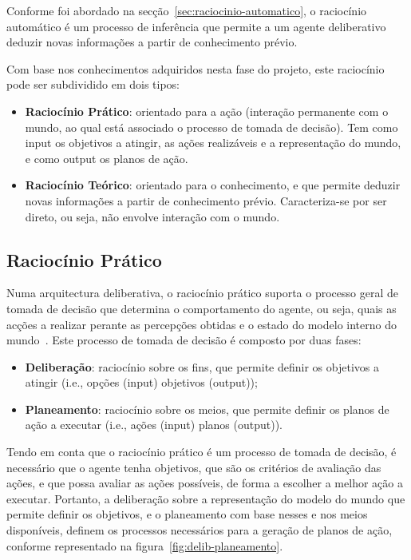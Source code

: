 Conforme foi abordado na secção~\ref{sec:raciocinio-automatico}, o raciocínio automático é um processo de inferência que permite a um agente deliberativo deduzir novas informações a partir de conhecimento prévio.

Com base nos conhecimentos adquiridos nesta fase do projeto, este raciocínio pode ser subdividido em dois tipos:

\begin{itemize}
    \item \textbf{Raciocínio Prático}: orientado para a ação (interação permanente com o mundo, ao qual está associado o processo de tomada de decisão).
    Tem como input os objetivos a atingir, as ações realizáveis e a representação do mundo, e como output os planos de ação.
    \item \textbf{Raciocínio Teórico}: orientado para o conhecimento, e que permite deduzir novas informações a partir de conhecimento prévio.
    Caracteriza-se por ser direto, ou seja, não envolve interação com o mundo.
\end{itemize}

\subsection{Raciocínio Prático}\label{subsec:raciocinio-pratico}

Numa arquitectura deliberativa, o raciocínio prático suporta o processo
geral de tomada de decisão que determina o comportamento do agente,
ou seja, quais as acções a realizar perante as percepções obtidas e o
estado do modelo interno do mundo~\cite{isel:iasa:slides:arq-agentes-deliberativos}.
Este processo de tomada de decisão é composto por duas fases:

\begin{itemize}
    \item \textbf{Deliberação}: raciocínio sobre os fins, que permite definir os objetivos a atingir (i.e., opções (input) \rightarrow objetivos (output));
    \item \textbf{Planeamento}: raciocínio sobre os meios, que permite definir os planos de ação a executar (i.e., ações (input) \rightarrow planos (output)).
\end{itemize}

Tendo em conta que o raciocínio prático é um processo de tomada de decisão, é necessário que o agente tenha objetivos, que são os critérios de avaliação das ações, e que possa avaliar as ações possíveis, de forma a escolher a melhor ação a executar.
Portanto, a deliberação sobre a representação do modelo do mundo que permite definir os objetivos, e o planeamento com base nesses e nos meios disponíveis, definem os processos necessários para a geração de planos de ação, conforme representado na figura~\ref{fig:delib-planeamento}.

